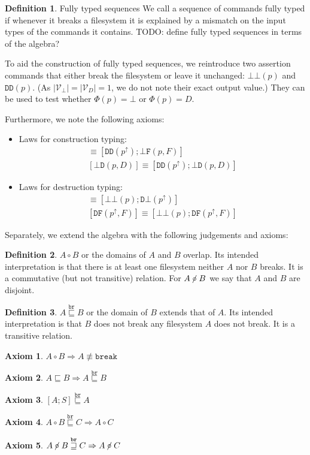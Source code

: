 \documentclass[12pt]{article}
\newcommand{\setvx}[1]{\mathcal{V}_{#1}}
\newcommand{\setd}{\setvx{D}}
\newcommand{\setb}{\setvx{\empt}}
\newcommand{\empt}{\bot}
\newcommand{\FS}{\Phi} %
\newcommand{\pp}{p^\uparrow} %
\newcommand{\cbrk}{\mathtt{break}}
\newcommand{\fscommand}[2]{{#1#2}}
\newcommand{\fsregcommandchar}[1]{\mathtt{#1}}
\newcommand{\fsregcommand}[2]{\fscommand{\fsregcommandchar{#1}}{\fsregcommandchar{#2}}}
\newcommand{\cbb}{\fsregcommand{\empt}{\empt}}
\newcommand{\cbf}{\fsregcommand{\empt}{F}}
\newcommand{\cbd}{\fsregcommand{\empt}{D}}
\newcommand{\cdb}{\fsregcommand{D}{\empt}}
\newcommand{\cdf}{\fsregcommand{D}{F}}
\newcommand{\cdd}{\fsregcommand{D}{D}}
\newcommand{\eqext}{\sqsubseteq}
\newcommand{\nequiv}{\not\equiv}
\newcommand{\wrext}{\stackrel{\mathtt{br}}{\sqsubseteq}}
\newcommand{\wrnrw}{\stackrel{\mathtt{br}}{\sqsupseteq}}
\newcommand{\coworks}{\circ}
\newcommand{\ncoworks}{\centernot\circ}
\theoremstyle{definition}
\newtheorem{mydef}{Definition}
\newtheorem{myax}{Axiom}
\begin{document}
\begin{mydef}{Fully typed sequences}
We call a sequence of commands fully typed if whenever it breaks a filesystem
it is explained by a mismatch on the input types of the commands it contains.
TODO: define fully typed sequences in terms of the algebra?
\end{mydef}

To aid the construction of fully typed sequences, we reintroduce
two assertion commands that either break the filesystem
or leave it unchanged: $\cbb(p)$ and $\cdd(p)$.
(As $|\setb|=|\setd|=1$, we do not note their exact output value.)
They can be used to test whether $\FS(p)=\empt$ or $\FS(p)=D$.

Furthermore, we note the following axioms:

\begin{itemize}
\item Laws for construction typing:
   \begin{gather*}
            [\cbf(p, F)] \equiv [\cdd(\pp); \cbf(p, F)]\\
            [\cbd(p, D)] \equiv [\cdd(\pp); \cbd(p, D)]
   \end{gather*}
\item Laws for destruction typing:
   \begin{gather*}
            [\cdb(\pp)] \equiv [\cbb(p); \cdb(\pp)]\\
            [\cdf(\pp, F)] \equiv [\cbb(p); \cdf(\pp, F)]
   \end{gather*}
\end{itemize}

Separately, we extend the algebra with the following judgements and axioms:

\begin{mydef}{$A\coworks B$}
or the domains of $A$ and $B$ overlap.
Its intended interpretation is that
there is at least one filesystem neither $A$ nor $B$ breaks.
It is a commutative (but not transitive) relation.
For $A\ncoworks B$ we say that $A$ and $B$ are disjoint.
\end{mydef}

\begin{mydef}{$A\wrext B$}
or the domain of $B$ extends that of $A$.
Its intended interpretation is that
$B$ does not break any filesystem $A$ does not break.
It is a transitive relation.
\end{mydef}


\begin{myax}$A\coworks B \Rightarrow A\nequiv\cbrk$\end{myax}
\begin{myax}$A\eqext B \Rightarrow A\wrext B$\end{myax}
\begin{myax}\label{axiom:wrextpostfix}$[A;S] \wrext A$\end{myax}
\begin{myax}$A\coworks B\wrext C \Rightarrow A\coworks C$\end{myax}
\begin{myax}\label{axiom:ncowwrnrw}$A\ncoworks B\wrnrw C \Rightarrow A\ncoworks C$\end{myax}
\end{document}
